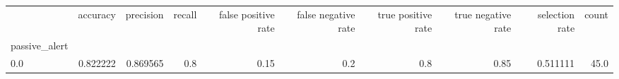 \begin{tabular}{lrrrrrrrrr}
\toprule
{} &  accuracy &  precision &  recall &  false positive rate &  false negative rate &  true positive rate &  true negative rate &  selection rate &  count \\
passive\_alert &           &            &         &                      &                      &                     &                     &                 &        \\
\midrule
0.0           &  0.822222 &   0.869565 &     0.8 &                 0.15 &                  0.2 &                 0.8 &                0.85 &        0.511111 &   45.0 \\
\bottomrule
\end{tabular}

